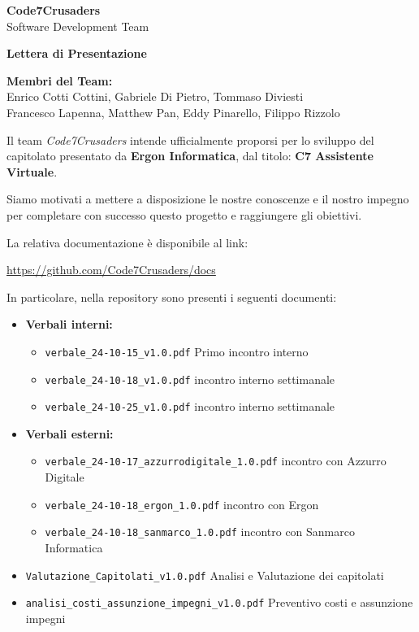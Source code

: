 \documentclass{article}
\begin{document}
\begin{titlepage}
    {\Huge \textbf{Code7Crusaders}}\\
    \vspace{0.5cm}
    {\Large Software Development Team}\\
    \vspace{2cm}
    
    {\large \textbf{Lettera di Presentazione}}\\
    \vspace{5cm}

    \textbf{Membri del Team:}\\
    Enrico Cotti Cottini, Gabriele Di Pietro, Tommaso Diviesti \\
    Francesco Lapenna, Matthew Pan, Eddy Pinarello, Filippo Rizzolo \\
    \vspace{0.5cm}
    
    \vspace{1cm}
\end{titlepage}


Il team \textit{Code7Crusaders} intende ufficialmente proporsi per lo sviluppo del capitolato presentato da \textbf{Ergon Informatica}, 
dal titolo: \textbf{C7 Assistente Virtuale}.

Siamo motivati a mettere a disposizione le nostre conoscenze e il nostro impegno 
per completare con successo questo progetto e raggiungere gli obiettivi.

La relativa documentazione è disponibile al link:
\begin{center}
    \url{https://github.com/Code7Crusaders/docs}
\end{center}
In particolare, nella repository sono presenti i seguenti documenti:
\begin{itemize}
    \item \textbf{Verbali interni:}
    \begin{itemize}
        \item \texttt{verbale\_24-10-15\_v1.0.pdf} Primo incontro interno
        \item \texttt{verbale\_24-10-18\_v1.0.pdf} incontro interno settimanale
        \item \texttt{verbale\_24-10-25\_v1.0.pdf} incontro interno settimanale
    \end{itemize}
    \item \textbf{Verbali esterni:}
    \begin{itemize}
        \item \texttt{verbale\_24-10-17\_azzurrodigitale\_1.0.pdf} incontro con Azzurro Digitale
        \item \texttt{verbale\_24-10-18\_ergon\_1.0.pdf} incontro con Ergon
        \item \texttt{verbale\_24-10-18\_sanmarco\_1.0.pdf} incontro con Sanmarco Informatica
    \end{itemize}
    \item \texttt{Valutazione\_Capitolati\_v1.0.pdf} Analisi e Valutazione dei capitolati 
    \item \texttt{analisi\_costi\_assunzione\_impegni\_v1.0.pdf} Preventivo costi e assunzione impegni
\end{itemize}
\end{document}
